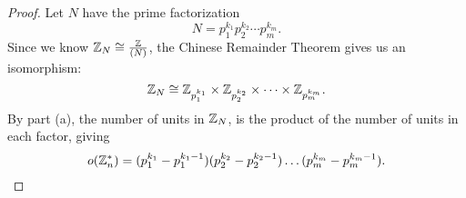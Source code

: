 \documentclass[12pt]{article}
\begin{document}
\begin{enumerate}
\begin{enumerate}
\begin{proof}
				Let $N$ have the prime factorization
				\[N = p_1^{k_1} p_2^{k_2} \cdots p_m^{k_m}.\]
				Since we know $\mathbb{Z}_N \cong \frac{\mathbb{Z}}{(N)}$, the Chinese Remainder Theorem gives us an isomorphism:
				\[
				\mathbb{Z}_N \cong \mathbb{Z}_{p_1^{k_1}} \times \mathbb{Z}_{p_2^{k_2}} \times \cdots \times \mathbb{Z}_{p_m^{k_m}}.
				\]
				By part (a), the number of units in $\mathbb{Z}_N$, is the product of the number of units in each factor, giving
				\[
				o(\mathbb{Z}_n^*) = (p_1^{k_1} - p_1^{k_1-1}) (p_2^{k_2} - p_2^{k_2-1}) \ldots (p_m^{k_m} - p_m^{k_m-1}).
				\]
			\end{proof}
		\end{enumerate}
		
	\end{enumerate}
\end{document}
